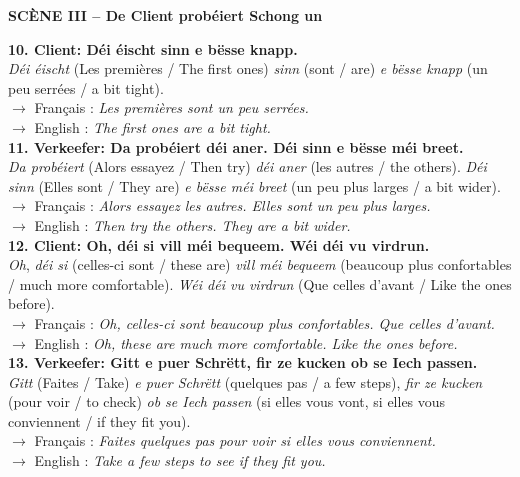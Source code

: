 \noindent\textbf{SCÈNE III -- De Client probéiert Schong un}

\noindent\textbf{10. Client: Déi éischt sinn e bësse knapp.}\\
\textit{Déi éischt} (Les premières / The first ones) \textit{sinn} (sont / are) \textit{e bësse knapp} (un peu serrées / a bit tight).\\
$\rightarrow$ Français : \textit{Les premières sont un peu serrées.}\\
$\rightarrow$ English : \textit{The first ones are a bit tight.}\\[0.5em]

\noindent\textbf{11. Verkeefer: Da probéiert déi aner. Déi sinn e bësse méi breet.}\\
\textit{Da probéiert} (Alors essayez / Then try) \textit{déi aner} (les autres / the others). \textit{Déi sinn} (Elles sont / They are) \textit{e bësse méi breet} (un peu plus larges / a bit wider).\\
$\rightarrow$ Français : \textit{Alors essayez les autres. Elles sont un peu plus larges.}\\
$\rightarrow$ English : \textit{Then try the others. They are a bit wider.}\\[0.5em]

\noindent\textbf{12. Client: Oh, déi si vill méi bequeem. Wéi déi vu virdrun.}\\
\textit{Oh}, \textit{déi si} (celles-ci sont / these are) \textit{vill méi bequeem} (beaucoup plus confortables / much more comfortable). \textit{Wéi déi vu virdrun} (Que celles d'avant / Like the ones before).\\
$\rightarrow$ Français : \textit{Oh, celles-ci sont beaucoup plus confortables. Que celles d'avant.}\\
$\rightarrow$ English : \textit{Oh, these are much more comfortable. Like the ones before.}\\[0.5em]

\noindent\textbf{13. Verkeefer: Gitt e puer Schrëtt, fir ze kucken ob se Iech passen.}\\
\textit{Gitt} (Faites / Take) \textit{e puer Schrëtt} (quelques pas / a few steps), \textit{fir ze kucken} (pour voir / to check) \textit{ob se Iech passen} (si elles vous vont, si elles vous conviennent / if they fit you).\\
$\rightarrow$ Français : \textit{Faites quelques pas pour voir si elles vous conviennent.}\\
$\rightarrow$ English : \textit{Take a few steps to see if they fit you.}\\[0.5em]

